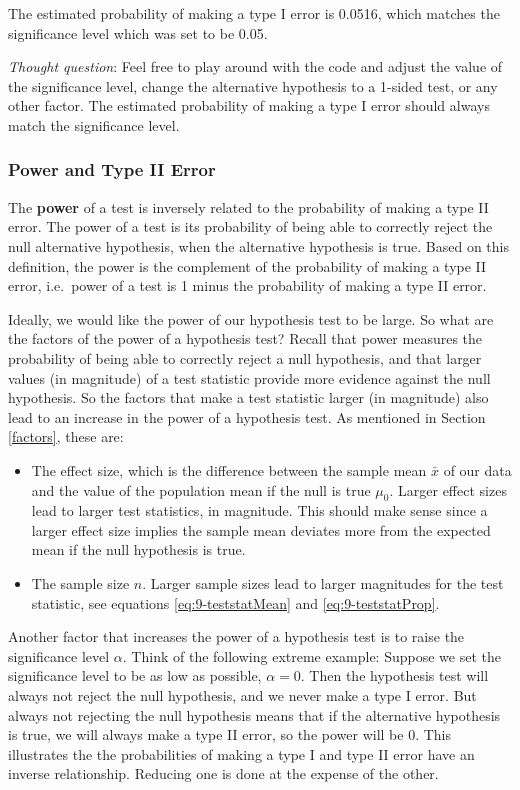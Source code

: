 \documentclass[
]{book}
\begin{document}
The estimated probability of making a type I error is 0.0516, which matches the significance level which was set to be 0.05.

\emph{Thought question}: Feel free to play around with the code and adjust the value of the significance level, change the alternative hypothesis to a 1-sided test, or any other factor. The estimated probability of making a type I error should always match the significance level.

\subsubsection{Power and Type II Error}\label{power}

The \textbf{power} of a test is inversely related to the probability of making a type II error. The power of a test is its probability of being able to correctly reject the null alternative hypothesis, when the alternative hypothesis is true. Based on this definition, the power is the complement of the probability of making a type II error, i.e.~power of a test is 1 minus the probability of making a type II error.

Ideally, we would like the power of our hypothesis test to be large. So what are the factors of the power of a hypothesis test? Recall that power measures the probability of being able to correctly reject a null hypothesis, and that larger values (in magnitude) of a test statistic provide more evidence against the null hypothesis. So the factors that make a test statistic larger (in magnitude) also lead to an increase in the power of a hypothesis test. As mentioned in Section \ref{factors}, these are:

\begin{itemize}
\item
  The effect size, which is the difference between the sample mean \(\bar{x}\) of our data and the value of the population mean if the null is true \(\mu_0\). Larger effect sizes lead to larger test statistics, in magnitude. This should make sense since a larger effect size implies the sample mean deviates more from the expected mean if the null hypothesis is true.
\item
  The sample size \(n\). Larger sample sizes lead to larger magnitudes for the test statistic, see equations \eqref{eq:9-teststatMean} and \eqref{eq:9-teststatProp}.
\end{itemize}

Another factor that increases the power of a hypothesis test is to raise the significance level \(\alpha\). Think of the following extreme example: Suppose we set the significance level to be as low as possible, \(\alpha=0\). Then the hypothesis test will always not reject the null hypothesis, and we never make a type I error. But always not rejecting the null hypothesis means that if the alternative hypothesis is true, we will always make a type II error, so the power will be 0. This illustrates the the probabilities of making a type I and type II error have an inverse relationship. Reducing one is done at the expense of the other.
\end{document}
